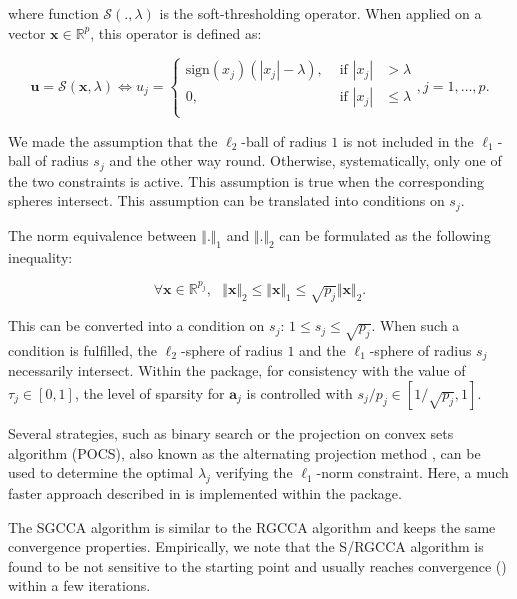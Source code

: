 \documentclass[
]{jss}
\begin{document}
where function \(\mathcal{S}(., \lambda)\) is the soft-thresholding
operator. When applied on a vector \(\mathbf x\in\mathbb{R}^p\), this
operator is defined as:

\begin{equation}
     \mathbf u = \mathcal{S}(\mathbf x, \lambda) \Leftrightarrow u_j = \left\lbrace
    \begin{array}{ccc}
        {\mathrm{sign}}(x_j)(|x_j| -  \lambda), & \text{ if } |x_j| &> \lambda\\
        0, & \text{ if } |x_j| &\leq \lambda\\ 
    \end{array}\right., j = 1, \ldots, p.
\end{equation}

We made the assumption that the \(\ell_2\)-ball of radius \(1\) is not
included in the \(\ell_1\)-ball of radius \(s_j\) and the other way
round. Otherwise, systematically, only one of the two constraints is
active. This assumption is true when the corresponding spheres
intersect. This assumption can be translated into conditions on \(s_j\).

The norm equivalence between \(\Vert . \Vert_1\) and \(\Vert . \Vert_2\)
can be formulated as the following inequality:

\begin{equation}
    \forall \mathbf x \in \mathbb{R}^{p_j}, \text{ } \Vert \mathbf x \Vert_2 \leq \Vert \mathbf x \Vert_1 \leq \sqrt{p_j}\Vert \mathbf x \Vert_2.
\label{existence_conditions}
\end{equation}

This can be converted into a condition on \(s_j\):
\(1 \leq s_j \leq \sqrt{p_j}\). When such a condition is fulfilled, the
\(\ell_2\)-sphere of radius \(1\) and the \(\ell_1\)-sphere of radius
\(s_j\) necessarily intersect. Within the  package, for
consistency with the value of \(\tau_j \in [0, 1]\), the level of
sparsity for \(\mathbf a_j\) is controlled with
\(s_j/p_j \in [1/\sqrt{p_j}, 1]\).

Several strategies, such as binary search or the projection on convex
sets algorithm (POCS), also known as the alternating projection method
\citep{Boyd2003}, can be used to determine the optimal \(\lambda_j\)
verifying the \(\ell_1\)-norm constraint. Here, a much faster approach
described in \cite{Gloaguen2017} is implemented within the 
package.

The SGCCA algorithm is similar to the RGCCA algorithm and keeps the same
convergence properties. Empirically, we note that the S/RGCCA algorithm
is found to be not sensitive to the starting point and usually reaches
convergence () within a few iterations.
\end{document}
